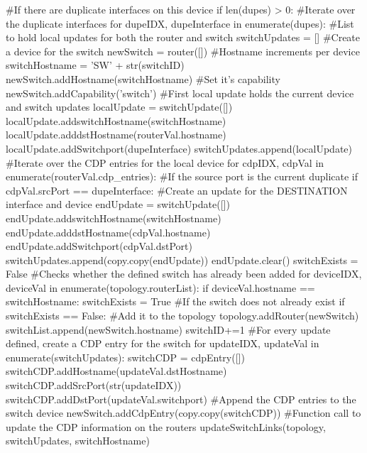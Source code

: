 \documentclass[11pt]{report}
\begin{document}
\begin{appendices}
\begin{python}
			#If there are duplicate interfaces on this device
			if len(dupes) > 0:	
				#Iterate over the duplicate interfaces
				for dupeIDX, dupeInterface in enumerate(dupes):
					#List to hold local updates for both the router and switch
					switchUpdates = []	
					#Create a device for the switch
					newSwitch = router([])
					#Hostname increments per device
					switchHostname = 'SW' + str(switchID)
					newSwitch.addHostname(switchHostname)
					#Set it's capability
					newSwitch.addCapability('switch')
					#First local update holds the current device and switch updates
					localUpdate = switchUpdate([])
					localUpdate.addswitchHostname(switchHostname)
					localUpdate.adddstHostname(routerVal.hostname)
					localUpdate.addSwitchport(dupeInterface)
					switchUpdates.append(localUpdate)
					#Iterate over the CDP entries for the local device
					for cdpIDX, cdpVal in enumerate(routerVal.cdp_entries):
						#If the source port is  the current duplicate
						if cdpVal.srcPort == dupeInterface:
							#Create an update for the DESTINATION interface and device
							endUpdate = switchUpdate([])
							endUpdate.addswitchHostname(switchHostname)
							endUpdate.adddstHostname(cdpVal.hostname)
							endUpdate.addSwitchport(cdpVal.dstPort)
							switchUpdates.append(copy.copy(endUpdate))
							endUpdate.clear()
					switchExists = False
					#Checks whether the defined switch has already been added
					for deviceIDX, deviceVal in enumerate(topology.routerList):
						if deviceVal.hostname == switchHostname:
							switchExists = True
					#If the switch does not already exist
					if switchExists == False:
						#Add it to the topology
						topology.addRouter(newSwitch)
						switchList.append(newSwitch.hostname)
						switchID+=1
					#For every update defined, create a CDP entry for the switch
					for updateIDX, updateVal in enumerate(switchUpdates):
						switchCDP = cdpEntry([])
						switchCDP.addHostname(updateVal.dstHostname)
						switchCDP.addSrcPort(str(updateIDX))
						switchCDP.addDstPort(updateVal.switchport)
						#Append the CDP entries to the switch device
						newSwitch.addCdpEntry(copy.copy(switchCDP))
					#Function call to update the CDP information on the routers
					updateSwitchLinks(topology, switchUpdates, switchHostname)
\end{python}
\end{appendices}
\end{document}
